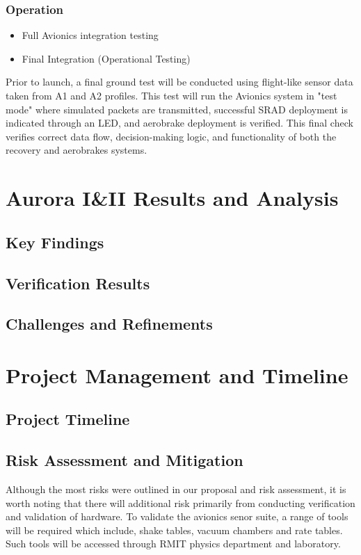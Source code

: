 \subsubsection{Operation}
\begin{itemize}
  \item Full Avionics integration testing  
  \item Final Integration (Operational Testing) 
\end{itemize}

Prior to launch, a final ground test will be conducted using flight-like sensor data taken from A1 and A2 profiles. This test will run the Avionics system in "test mode" where simulated packets are transmitted, successful SRAD deployment is indicated through an LED, and aerobrake deployment is verified. This final check verifies correct data flow, decision-making logic, and functionality of both the recovery and aerobrakes systems. 

\section{Aurora I\&II Results and Analysis}
\subsection{Key Findings}
\subsection{Verification Results}
\subsection{Challenges and Refinements}

\section{Project Management and Timeline}
\subsection{Project Timeline}

\subsection{Risk Assessment and Mitigation}
Although the most risks were outlined in our proposal and risk assessment, it is worth noting that there will additional risk primarily from conducting verification and validation of hardware. To validate the avionics senor suite, a range of tools will be required which include, shake tables, vacuum chambers and rate tables. Such tools will be accessed through RMIT physics department and laboratory. 

